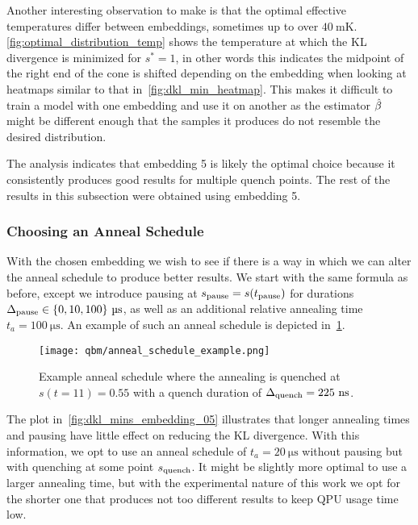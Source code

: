 Another interesting observation to make is that the optimal effective temperatures differ between embeddings, sometimes up to over \( 40 \ \si{\milli\kelvin} \).
\cref{fig:optimal_distribution_temp} shows the temperature at which the KL divergence is minimized for \( s^* = 1 \), in other words this indicates the midpoint of the right end of the cone is shifted depending on the embedding when looking at heatmaps similar to that in~\cref{fig:dkl_min_heatmap}.
This makes it difficult to train a model with one embedding and use it on another as the estimator \( \hat{\beta} \) might be different enough that the samples it produces do not resemble the desired distribution.

The analysis indicates that embedding 5 is likely the optimal choice because it consistently produces good results for multiple quench points.
The rest of the results in this subsection were obtained using embedding 5.

\subsubsection{Choosing an Anneal Schedule}
With the chosen embedding we wish to see if there is a way in which we can alter the anneal schedule to produce better results.
We start with the same formula as before, except we introduce pausing at \( s_{\text{pause}} = s(t_{\text{pause}}) \) for durations \( \Deltapause \in \{ 0, 10, 100 \} \ \si{\micro\second} \), as well as an additional relative annealing time \( t_a = 100 \ \si{\micro\second} \).
An example of such an anneal schedule is depicted in~\cref{fig:anneal_schedule_example}.
\begin{figure}[!htb]
    \begin{center}
        \texttt{[image: qbm/anneal\_schedule\_example.png]}
    \end{center}
    \caption{Example anneal schedule where the annealing is quenched at \( s(t = 11) = 0.55 \) with a quench duration of \( \Delta_{\text{quench}} = 225 \ \si{\nano\second} \).}
    \label{fig:anneal_schedule_example}
\end{figure}

The plot in~\cref{fig:dkl_mins_embedding_05} illustrates that longer annealing times and pausing have little effect on reducing the KL divergence.
With this information, we opt to use an anneal schedule of \( t_a = 20 \ \si{\micro\second} \) without pausing but with quenching at some point \( s_{\text{quench}} \).
It might be slightly more optimal to use a larger annealing time, but with the experimental nature of this work we opt for the shorter one that produces not too different results to keep QPU usage time low.

